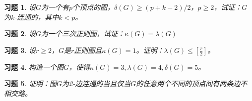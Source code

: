 \documentclass{article}
\begin{document}
\begin{CJK}{UTF8}{gbsn}
\newtheorem{Exercise}{习题}
\begin{Exercise}
  设$G$为一个有$p$个顶点的图，$\delta(G) \geq (p+k-2)/2$，$p\geq 2$，试证：$G$为$k$-连通的，其中$k<p$。
\end{Exercise}
\vspace{10cm}
\begin{Exercise}
  设$G$为一个三次正则图，试证：$\kappa(G)=\lambda(G)$
\end{Exercise}
\clearpage
\begin{Exercise}
  设$r\geq 2$，$G$是$r$正则图且$\kappa (G)=1$。证明：$\lambda(G) \leq [\frac{r}{2}]$。
\end{Exercise}
\vspace{10cm}
%
%
%
%
%
%
\begin{Exercise}
  构造一个图$G$，使得$\kappa(G)=3,\lambda(G)=4,\delta(G)=5$。
\end{Exercise}
\clearpage
  \begin{Exercise}
    证明：图$G$为2-边连通的当且仅当$G$的任意两个不同的顶点间有两条边不相交路。
  \end{Exercise}
  
\end{CJK}
\end{document}
